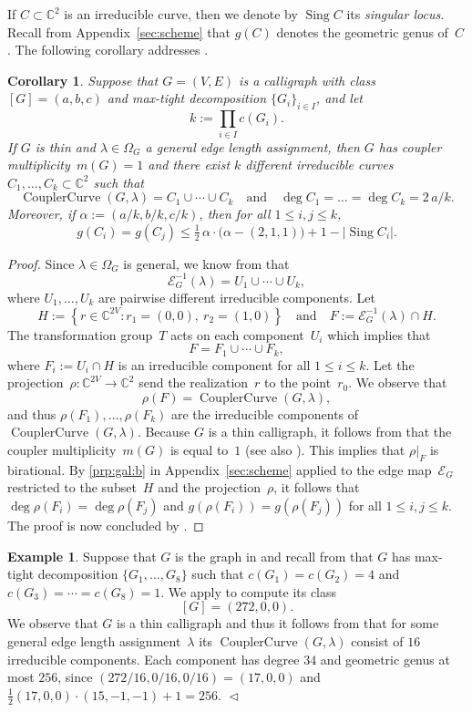 \documentclass[12pt]{article}
\newtheorem{corollary}{Corollary}
\theoremstyle{definition}
\newtheorem{example}[lemma]{Example}
\newcommand{\APP}[1]{Appendix~\ref{sec:#1}}
\newcommand{\RP}[2]{\Cref{prp:#1}\ref{prp:#1:#2}}
\newcommand{\END}{\hfill $\vartriangleleft$}
\newcommand{\df}[1]{{\it #1}}
\newcommand{\st}{such that }
\renewcommand{\c}{\colon}
\newcommand{\set}[2]{\left\{#1:#2\right\}}
\newcommand{\Sing}{\operatorname{Sing}}
\newcommand{\C}{{\mathbb{C}}}
\newcommand{\cE}{\mathcal{E}}
\newcommand{\CouplerCurve}{\operatorname{CouplerCurve}}
\begin{document}
If $C\subset \C^2$ is an irreducible curve,
then we denote by $\Sing C$ its \df{singular locus}.
Recall from \APP{scheme} that $g(C)$ denotes the geometric genus of~$C$.
The following corollary addresses
\citep[Conjecture~2 and Open problem~3]{2023-cal}.

\begin{corollary}
\label{cor:cal}
Suppose that $G=(V,E)$ is a calligraph with class $[G]=(a,b,c)$
and max-tight decomposition $\{G_i\}_{i\in I}$, and let
\[
k:=\prod_{i\in I}c(G_i).
\]
If $G$ is thin and $\lambda\in\Omega_G$ a general edge length assignment,
then $G$ has coupler multiplicity~$m(G)=1$ and there exist $k$ different irreducible curves $C_1,\ldots,C_k\subset \C^2$
\st
\[
\CouplerCurve(G,\lambda)=C_1\cup\cdots\cup C_k
\quad\text{and}\quad
\deg C_1=\ldots=\deg C_k=2\,a/k.
\]
Moreover, if $\alpha:=(a/k,b/k,c/k)$, then for all $1\leq i,j\leq k$,
\[
g(C_i)=g(C_j)\leq \tfrac{1}{2}\,\alpha\cdot \bigl(\alpha-(2,1,1)\bigr) + 1 -|\Sing C_i|.
\]
\end{corollary}

\begin{proof}
Since $\lambda\in\Omega_G$ is general,
we know from  that
\[
\cE_G^{-1}(\lambda)=U_1\cup\cdots\cup U_k,
\]
where $U_1,\ldots,U_k$ are pairwise different irreducible components.
Let
\[
H:=\set{r\in \C^{2V}}{r_1=(0,0),~r_2=(1,0)}
\quad\text{and}\quad
F:=\cE^{-1}_G(\lambda)\cap H.
\]
The transformation group~$T$ acts on each component~$U_i$
which implies that
\[
F=F_1\cup\cdots\cup F_k,
\]
where $F_i:=U_i\cap H$ is
an irreducible component for all $1\leq i\leq k$.
Let the projection~$\rho\c \C^{2V}\to \C^2$ send the realization~$r$ to the point~$r_0$.
We observe that
\[
\rho(F)=\CouplerCurve(G,\lambda),
\]
and thus $\rho(F_1),\ldots,\rho(F_k)$ are the irreducible components of
$\CouplerCurve(G,\lambda)$.
Because $G$ is a thin calligraph, it follows from \citep[Corollary~I(P2)]{2023-cal}
that the coupler multiplicity~$m(G)$ is equal to~$1$ (see also \citep[Lemma~16]{2023-cal}).
This implies that $\rho|_F$ is birational.
By \RP{gal}{b} in \APP{scheme} applied to the edge map~$\cE_G$ restricted to the subset~$H$ and the projection~$\rho$,
it follows that
$\deg\rho(F_i)=\deg\rho(F_j)$ and $g(\rho(F_i))=g(\rho(F_j))$ for all $1\leq i,j\leq k$.
The proof is now concluded by \citep[Corollary~I(P6)]{2023-cal}.
\end{proof}

\begin{example}
Suppose that $G$ is the graph in 
and recall from  that $G$ has max-tight decomposition
$\{G_1,\ldots,G_8\}$ \st $c(G_1)=c(G_2)=4$ and $c(G_3)=\cdots=c(G_8)=1$.
We apply \citep[Algorithm~1]{2023-cal,2022-m} to compute its class
\[
[G]=(272,0,0).
\]
We observe that $G$ is a thin calligraph and
thus it follows from  that for some general edge length assignment~$\lambda$
its $\CouplerCurve(G,\lambda)$ consist of $16$ irreducible components.
Each component has degree $34$ and geometric genus at most $256$,
since
$(272/16,0/16,0/16)=(17,0,0)$
and
$\tfrac{1}{2}(17,0,0)\cdot(15,-1,-1)+1=256$.
\END
\end{example}
\end{document}

